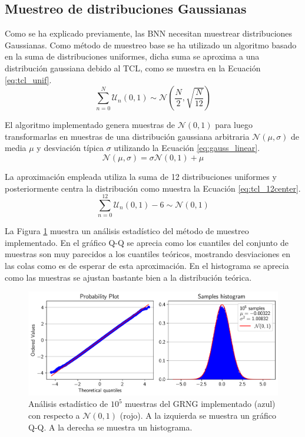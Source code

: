 \subsection{Muestreo de distribuciones Gaussianas}

Como se ha explicado previamente, las BNN necesitan muestrear distribuciones Gaussianas. Como método de muestreo base se ha utilizado un algoritmo basado en la suma de distribuciones uniformes, dicha suma se aproxima a una distribución gaussiana debido al TCL, como se muestra en la Ecuación \ref{eq:tcl_unif}.
\begin{equation} \label{eq:tcl_unif}
\sum_{n=0}^{N} \mathcal{U}_n(0,1) \sim \mathcal{N} \left( \dfrac{N}{2}, \sqrt{\dfrac{N}{12}} \right)
\end{equation}

El algoritmo implementado genera muestras de $\mathcal{N}(0,1)$ para luego transformarlas en muestras de una distribución gaussiana arbitraria $\mathcal{N}(\mu, \sigma)$ de media $\mu$ y desviación típica $\sigma$ utilizando la Ecuación \ref{eq:gauss_linear}.
\begin{equation} \label{eq:gauss_linear}
\mathcal{N}(\mu, \sigma) = \sigma \mathcal{N}(0,1) + \mu
\end{equation}

La aproximación empleada utiliza la suma de 12 distribuciones uniformes y posteriormente centra la distribución como muestra la Ecuación \ref{eq:tcl_12center}.
\begin{equation} \label{eq:tcl_12center}
\sum_{n=0}^{12} \mathcal{U}_n(0,1) - 6 \sim \mathcal{N}(0,1)
\end{equation}

La Figura \ref{fig:gauss_aprox} muestra un análisis estadístico del método de muestreo implementado. En el gráfico Q-Q se aprecia como los cuantiles del conjunto de muestras son muy parecidos a los cuantiles teóricos, mostrando desviaciones en las colas como es de esperar de esta aproximación. En el histograma se aprecia como las muestras se ajustan bastante bien a la distribución teórica.

\begin{figure}[h]
	\centering
	\includegraphics[width=\textwidth]{root/Imagenes/bnn_lib/gaus_aprox.png}
	\caption{Análisis estadístico de $10^5$ muestras del GRNG implementado (azul) con respecto a $\mathcal{N}(0,1)$ (rojo). A la izquierda se muestra un gráfico Q-Q. A la derecha se muestra un histograma.}
	\label{fig:gauss_aprox}
\end{figure}

